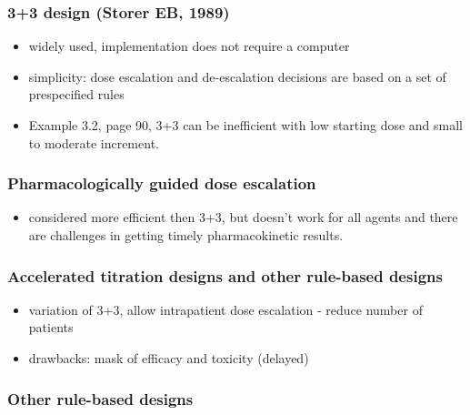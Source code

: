 \documentclass[
]{article}
\providecommand{\tightlist}{%
  \setlength{\itemsep}{0pt}\setlength{\parskip}{0pt}}
\begin{document}
\hypertarget{design-storer-eb-1989}{%
\subsubsection{3+3 design (Storer EB,
1989)}\label{design-storer-eb-1989}}

\begin{itemize}
\tightlist
\item
  widely used, implementation does not require a computer
\item
  simplicity: dose escalation and de-escalation decisions are based on a
  set of prespecified rules
\item
  Example 3.2, page 90, 3+3 can be inefficient with low starting dose
  and small to moderate increment.
\end{itemize}

\hypertarget{pharmacologically-guided-dose-escalation}{%
\subsubsection{Pharmacologically guided dose
escalation}\label{pharmacologically-guided-dose-escalation}}

\begin{itemize}
\tightlist
\item
  considered more efficient then 3+3, but doesn't work for all agents
  and there are challenges in getting timely pharmacokinetic results.
\end{itemize}

\hypertarget{accelerated-titration-designs-and-other-rule-based-designs}{%
\subsubsection{Accelerated titration designs and other rule-based
designs}\label{accelerated-titration-designs-and-other-rule-based-designs}}

\begin{itemize}
\tightlist
\item
  variation of 3+3, allow intrapatient dose escalation - reduce number
  of patients
\item
  drawbacks: mask of efficacy and toxicity (delayed)
\end{itemize}

\hypertarget{other-rule-based-designs}{%
\subsubsection{Other rule-based
designs}\label{other-rule-based-designs}}
\end{document}
